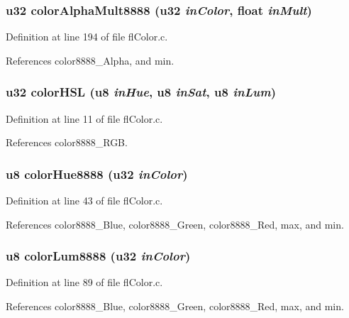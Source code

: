 \subsubsection{\setlength{\rightskip}{0pt plus 5cm}u32 color\-Alpha\-Mult8888 (u32 {\em in\-Color}, float {\em in\-Mult})}\label{flColor_8h_fb596a1100915bb37f2077abd553b0f4}




Definition at line 194 of file fl\-Color.c.

References color8888\_\-Alpha, and min.
\subsubsection{\setlength{\rightskip}{0pt plus 5cm}u32 color\-HSL (u8 {\em in\-Hue}, u8 {\em in\-Sat}, u8 {\em in\-Lum})}\label{flColor_8h_1f1236cd3a557da2460a8ea749a1a281}




Definition at line 11 of file fl\-Color.c.

References color8888\_\-RGB.
\subsubsection{\setlength{\rightskip}{0pt plus 5cm}u8 color\-Hue8888 (u32 {\em in\-Color})}\label{flColor_8h_9b21668439ded2a1e473584fa56ee9a1}




Definition at line 43 of file fl\-Color.c.

References color8888\_\-Blue, color8888\_\-Green, color8888\_\-Red, max, and min.
\subsubsection{\setlength{\rightskip}{0pt plus 5cm}u8 color\-Lum8888 (u32 {\em in\-Color})}\label{flColor_8h_a8a43be1182590891faaf0c93d26e62f}




Definition at line 89 of file fl\-Color.c.

References color8888\_\-Blue, color8888\_\-Green, color8888\_\-Red, max, and min.

